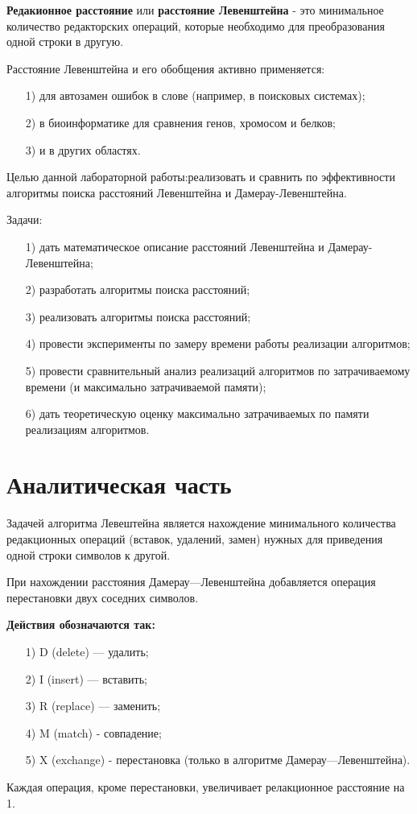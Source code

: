 \documentclass[12pt]{report}
\begin{document}
	\textbf{Редакионное расстояние} или \textbf{расстояние Левенштейна} - это минимальное количество редакторских операций, которые необходимо для преобразования одной строки в другую.
	
	Расстояние Левенштейна и его обобщения активно применяется: 
	\begin{enumerate}
		\item[1)] для автозамен ошибок в слове (например, в поисковых системах);
		\item[2)] в биоинформатике для сравнения генов, хромосом и белков;
		\item[3)] и в других областях.
	\end{enumerate}
	
	Целью данной лабораторной работы:реализовать и сравнить по эффективности алгоритмы поиска расстояний Левенштейна и Дамерау-Левенштейна.
	
	Задачи:
	\begin{enumerate}
		\item[1)] дать математическое описание расстояний Левенштейна и Дамерау-Левенштейна;
		\item[2)] разработать алгоритмы поиска расстояний;
		\item[3)] реализовать алгоритмы поиска расстояний;
		\item[4)] провести эксперименты по замеру времени работы реализации алгоритмов;
		\item[5)] провести сравнительный анализ реализаций алгоритмов по затрачиваемому времени (и максимально затрачиваемой памяти);
		\item[6)] дать теоретическую оценку максимально затрачиваемых по памяти реализациям алгоритмов.
	\end{enumerate}
	
	\chapter{Аналитическая часть} 
	Задачей алгоритма Левештейна является нахождение минимального количества редакционных операций (вставок, удалений, замен) нужных для приведения одной строки символов к другой.
	
	При нахождении расстояния Дамерау—Левенштейна добавляется операция перестановки двух соседних символов. 
	
	\textbf{Действия обозначаются так:} 
	\begin{enumerate}
		\item[1)] D (delete) — удалить;
		\item[2)] I (insert) — вставить;
		\item[3)] R (replace) — заменить;
		\item[4)] M (match) - совпадение;
		\item[5)] X (exchange) - перестановка (только в алгоритме Дамерау—Левенштейна).
	\end{enumerate}
Каждая операция, кроме перестановки, увеличивает релакционное расстояние на 1.
\end{document}
